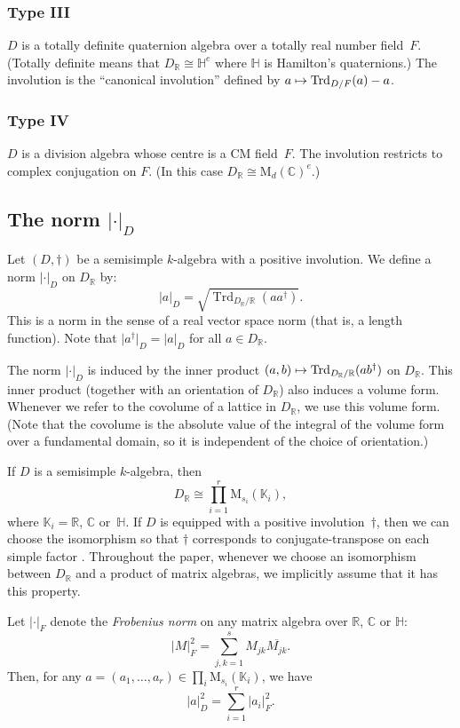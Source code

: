 \documentclass[JEP,XML,SOM,Unicode,NoFloatCountersInSection]{cedram}
\def\mto{\mathchoice{\longmapsto}{\mapsto}{\mapsto}{\mapsto}}
\newcommand{\bC}{\mathbb{C}}
\newcommand{\bH}{\mathbb{H}}
\newcommand{\bK}{\mathbb{K}}
\newcommand{\bR}{\mathbb{R}}
\newcommand{\rM}{\mathrm{M}}
\DeclareMathOperator{\Trd}{Trd}
\newcommand{\abs}[1]{\lvert #1 \rvert}
\let\ov\overline
\newcommand{\defterm}[1]{\emph{#1}}
\begin{document}
\subsubsection*{Type III} $D$ is a totally definite quaternion algebra over a totally real number field~$F$. (Totally definite means that $D_\bR \cong \bH^e$ where $\bH$ is Hamilton's quaternions.)
The involution is the ``canonical involution'' defined by $a \mto \Trd_{D/F}(a) - a$.
\subsubsection*{Type IV} $D$ is a division algebra whose centre is a CM field~$F$.
The involution restricts to complex conjugation on $F$. (In this case $D_\bR \cong \rM_d(\bC)^e$.)

\subsection{The norm \texorpdfstring{$\abs{\cdot}_D$}{||D}} \label{subsec:norm-D}

Let $(D,\dag)$ be a semisimple $k$-algebra with a positive involution.
We define a norm $\abs{\cdot}_D$ on $D_\bR$ by:
\[
\abs{a}_D = \sqrt{\Trd_{D_\bR/\bR}(aa^\dag)}.
\]
This is a norm in the sense of a real vector space norm (that is, a length function).
Note that $\abs{a^\dag}_D = \abs{a}_D$ for all $a \in D_\bR$.

The norm $\abs{\cdot}_D$ is induced by the inner product $(a,b) \mto \Trd_{D_\bR/\bR}(ab^\dag)$ on $D_\bR$.
This inner product (together with an orientation of $D_\bR$) also induces a volume form. Whenever we refer to the covolume of a lattice in $D_\bR$, we use this volume form.
(Note that the covolume is the absolute value of the integral of the volume form over a fundamental domain, so it is independent of the choice of orientation.)

If $D$ is a semisimple $k$-algebra, then
\[
D_\bR \cong \prod_{i=1}^r \rM_{s_i}(\bK_i),
\]
where $\bK_i = \bR$, $\bC$ or~$\bH$.
If $D$ is equipped with a positive involution~$\dag$, then we can choose the isomorphism so that $\dag$ corresponds to conjugate-transpose on each simple factor \cite[Prop.\,8.4.7]{Voi21}.
Throughout the paper, whenever we choose an isomorphism between $D_\bR$ and a product of matrix algebras, we implicitly assume that it has this property.

Let $\abs{\cdot}_F$ denote the \defterm{Frobenius norm} on any matrix algebra over $\bR$, $\bC$ or $\bH$:
\[
\abs{M}_F^2 = \sum_{j,k=1}^s M_{jk} \ov{M_{jk}}.
\]
Then, for any $a = (a_1, \dotsc, a_r) \in \prod_i \rM_{s_i}(\bK_i)$, we have
\[
\abs{a}_D^2 = \sum_{i=1}^r \abs{a_i}_F^2.
\]
\end{document}
